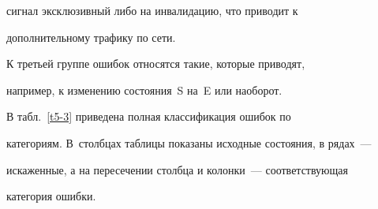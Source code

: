 сигнал эксклюзивный либо на инвалидацию, что приводит к 


дополнительному трафику по сети. 


      


      К третьей группе ошибок относятся такие, которые приводят, 


например, к изменению состояния~S на~E или наоборот.


      


      В табл.~\ref{t5-3} приведена полная классификация ошибок по 


категориям. В~столбцах таблицы показаны исходные состояния, в рядах~--- 


искаженные, а на пересечении столбца и колонки~--- соответствующая 


категория ошибки.


 


